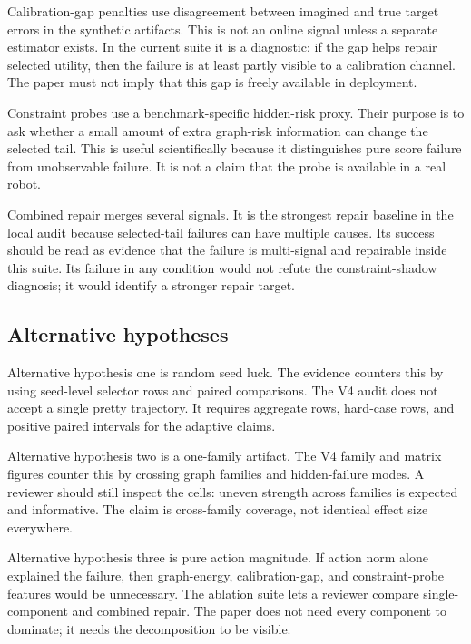 \documentclass{article}
\begin{document}
Calibration-gap penalties use disagreement between imagined and true target
errors in the synthetic artifacts.  This is not an online signal unless a
separate estimator exists.  In the current suite it is a diagnostic: if the gap
helps repair selected utility, then the failure is at least partly visible to a
calibration channel.  The paper must not imply that this gap is freely available
in deployment.

Constraint probes use a benchmark-specific hidden-risk proxy.  Their purpose is
to ask whether a small amount of extra graph-risk information can change the
selected tail.  This is useful scientifically because it distinguishes pure
score failure from unobservable failure.  It is not a claim that the probe is
available in a real robot.

Combined repair merges several signals.  It is the strongest repair baseline in
the local audit because selected-tail failures can have multiple causes.  Its
success should be read as evidence that the failure is multi-signal and
repairable inside this suite.  Its failure in any condition would not refute the
constraint-shadow diagnosis; it would identify a stronger repair target.

\subsection{Alternative hypotheses}

Alternative hypothesis one is random seed luck.  The evidence counters this by
using seed-level selector rows and paired comparisons.  The V4 audit does not
accept a single pretty trajectory.  It requires aggregate rows, hard-case rows,
and positive paired intervals for the adaptive claims.

Alternative hypothesis two is a one-family artifact.  The V4 family and matrix
figures counter this by crossing graph families and hidden-failure modes.  A
reviewer should still inspect the cells: uneven strength across families is
expected and informative.  The claim is cross-family coverage, not identical
effect size everywhere.

Alternative hypothesis three is pure action magnitude.  If action norm alone
explained the failure, then graph-energy, calibration-gap, and constraint-probe
features would be unnecessary.  The ablation suite lets a reviewer compare
single-component and combined repair.  The paper does not need every component
to dominate; it needs the decomposition to be visible.
\end{document}
